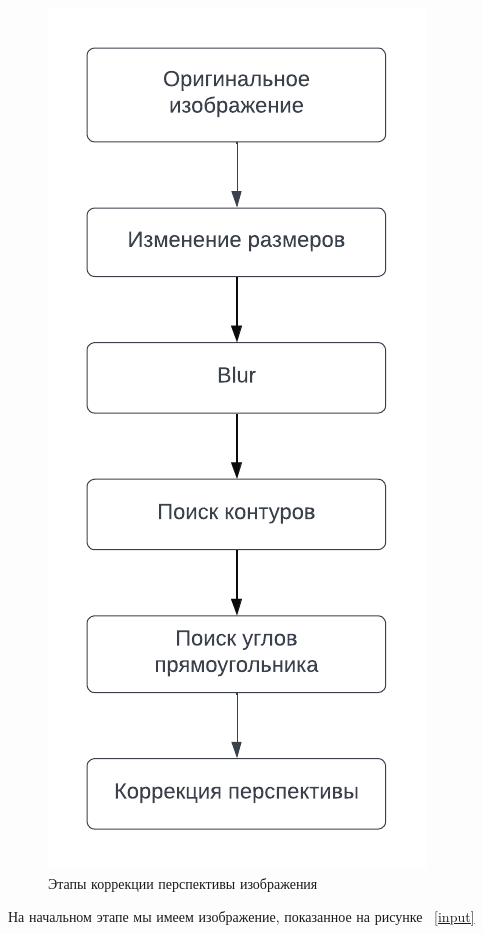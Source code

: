 \begin{figure}
    \includegraphics[scale=0.75]{img/perspective_correction}
    \caption{Этапы коррекции перспективы изображения}
    \label{perspective_correction_algo}
\end{figure}

На начальном этапе мы имеем изображение, показанное на рисунке ~\ref{input}

